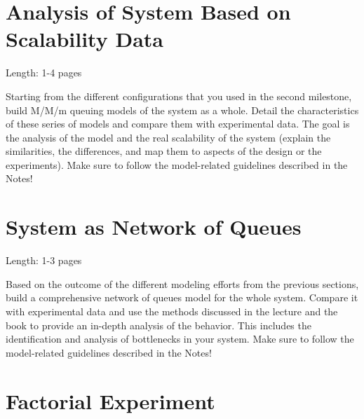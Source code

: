 \documentclass[11pt]{article}
\begin{document}
\clearpage
\section{Analysis of System Based on Scalability Data}\label{sec:analysis-scalability}

Length: 1-4 pages

Starting from the different configurations that you used in the second milestone, build M/M/m queuing models of the system as a whole. Detail the characteristics of these series of models and compare them with experimental data. The goal is the analysis of the model and the real scalability of the system (explain the similarities, the differences, and map them to aspects of the design or the experiments). Make sure to follow the model-related guidelines described in the Notes!

\clearpage
\section{System as Network of Queues}\label{sec:network-of-queues}

Length: 1-3 pages

Based on the outcome of the different modeling efforts from the previous sections, build a comprehensive network of queues model for the whole system. Compare it with experimental data and use the methods discussed in the lecture and the book to provide an in-depth analysis of the behavior. This includes the identification and analysis of bottlenecks in your system. Make sure to follow the model-related guidelines described in the Notes!


\clearpage
\section{Factorial Experiment}\label{sec:2k-experiment}
\end{document}
